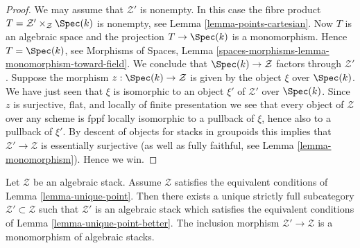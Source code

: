 \begin{proof}
We may assume that $\mathcal{Z}'$ is nonempty. In this case the
fibre product $T = \mathcal{Z}' \times_\mathcal{Z} \Spec(k)$
is nonempty, see
Lemma \ref{lemma-points-cartesian}.
Now $T$ is an algebraic space and the projection $T \to \Spec(k)$
is a monomorphism. Hence $T = \Spec(k)$, see
Morphisms of Spaces, Lemma
\ref{spaces-morphisms-lemma-monomorphism-toward-field}.
We conclude that $\Spec(k) \to \mathcal{Z}$ factors through
$\mathcal{Z}'$. Suppose the morphism $z : \Spec(k) \to \mathcal{Z}$
is given by the object $\xi$ over $\Spec(k)$. We have just seen that
$\xi$ is isomorphic to an object $\xi'$ of $\mathcal{Z}'$ over
$\Spec(k)$. Since $z$
is surjective, flat, and locally of finite presentation we see that
every object of $\mathcal{Z}$ over any scheme is fppf locally isomorphic
to a pullback of $\xi$, hence also to a pullback of $\xi'$. By descent of
objects for stacks in groupoids this implies that
$\mathcal{Z}' \to \mathcal{Z}$ is essentially surjective (as well as
fully faithful, see
Lemma \ref{lemma-monomorphism}).
Hence we win.
\end{proof}

\begin{lemma}
\label{lemma-improve-unique-point}
Let $\mathcal{Z}$ be an algebraic stack. Assume $\mathcal{Z}$ satisfies
the equivalent conditions of
Lemma \ref{lemma-unique-point}.
Then there exists a unique strictly full subcategory
$\mathcal{Z}' \subset \mathcal{Z}$ such that
$\mathcal{Z}'$ is an algebraic stack which satisfies the equivalent
conditions of
Lemma \ref{lemma-unique-point-better}.
The inclusion morphism $\mathcal{Z}' \to \mathcal{Z}$ is a monomorphism
of algebraic stacks.
\end{lemma}


